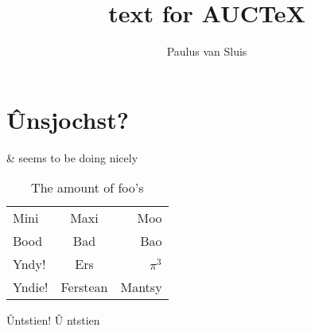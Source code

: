 \documentclass[a4paper]{memoir}
\title{text for AUC\TeX}
\author{Paulus van Sluis}
\begin{document}
\chapter{Ûnsjochst?}
\&   seems to be doing nicely

\begin{table}[h]
  \centering
  \begin{tabular}{lcr}\toprule
    Mini & Maxi & Moo\\
    Bood & Bad & Bao \\\midrule
    Yndy! & Ers & \(\pi^{3}\)\\
    Yndie! & Ferstean & Mantsy \\\bottomrule
  \end{tabular}
  \caption{The amount of foo's}
  \label{tab:foos}
\end{table}
Ûntstien! \^U%
ntstien 
\end{document}
